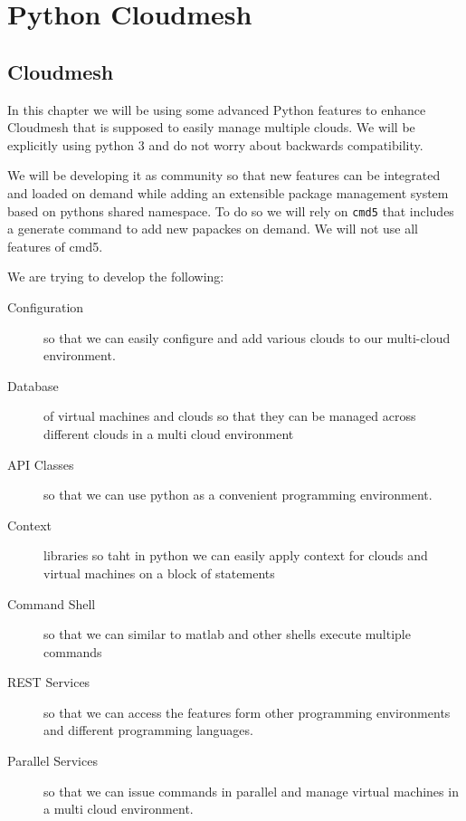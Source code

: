 \part{Python Cloudmesh}

\chapter{Cloudmesh}

In this chapter we will be using some advanced Python features to
enhance Cloudmesh that is supposed to easily manage multiple
clouds. We will be explicitly using python 3 and do
not worry about backwards compatibility.

We will be developing it as community so that new features can be
integrated and loaded on demand while adding an extensible package
management system based on pythons shared namespace. To do so we will
rely on \verb|cmd5| that includes a generate command to add new
papackes on demand. We will not use all features of cmd5.

We are trying to develop the following:

\begin{description}

\item[Configuration] so that we can easily configure and add various
  clouds to our multi-cloud environment.

\item[Database] of virtual machines and clouds so that they can be
  managed across different clouds in a multi cloud environment

\item[API Classes] so that we can use python as a convenient
  programming environment.

\item[Context] libraries so taht in python we can easily apply context
  for clouds and virtual machines on a block of statements

\item[Command Shell] so that we can similar to matlab
  and other shells execute multiple commands

\item[REST Services]  so that we can access the features
form other programming environments and different programming
languages.

\item[Parallel Services] so that we can issue commands in parallel and
  manage virtual machines in a multi cloud environment.

\end{description}



